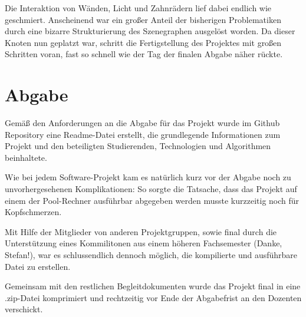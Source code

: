 \documentclass{article}
\begin{document}
Die Interaktion von Wänden, Licht und Zahnrädern lief dabei endlich wie geschmiert. 
Anscheinend war ein großer Anteil der bisherigen Problematiken durch eine bizarre Strukturierung des Szenegraphen ausgelöst worden. 
Da dieser Knoten nun geplatzt war, schritt die Fertigstellung des Projektes mit großen Schritten voran, fast so schnell wie der Tag der finalen Abgabe näher rückte. 

\section{Abgabe}
Gemäß den Anforderungen an die Abgabe für das Projekt wurde im Github Repository eine Readme-Datei erstellt, die grundlegende Informationen zum Projekt und den beteiligten Studierenden, Technologien und Algorithmen beinhaltete. 

Wie bei jedem Software-Projekt kam es natürlich kurz vor der Abgabe noch zu unvorhergesehenen Komplikationen: 
So sorgte die Tatsache, dass das Projekt auf einem der Pool-Rechner ausführbar abgegeben werden musste kurzzeitig noch für Kopfschmerzen. 

Mit Hilfe der Mitglieder von anderen Projektgruppen, sowie final durch die Unterstützung eines Kommilitonen aus einem höheren Fachsemester (Danke, Stefan!), war es schlussendlich dennoch möglich, die kompilierte und ausführbare Datei zu erstellen. 

Gemeinsam mit den restlichen Begleitdokumenten wurde das Projekt final in eine .zip-Datei komprimiert und rechtzeitig vor Ende der Abgabefrist an den Dozenten verschickt. 
\end{document}
